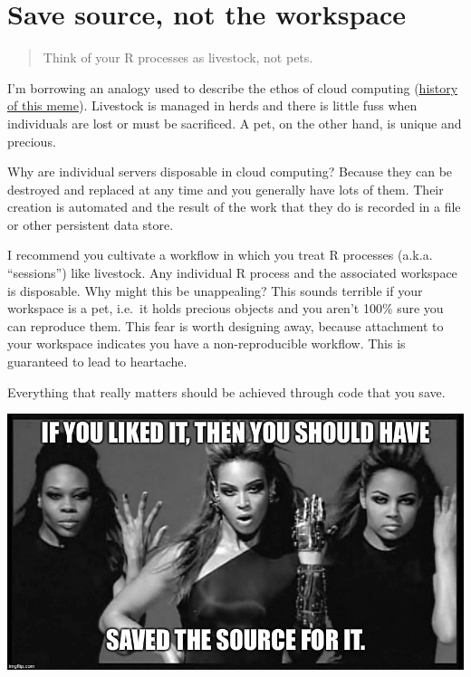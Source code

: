 \documentclass[
  letterpaper,
]{book}
\begin{document}
\hypertarget{save-source-not-the-workspace}{%
\section*{Save source, not the
workspace}\label{save-source-not-the-workspace}}

\begin{quote}
Think of your R processes as livestock, not pets.
\end{quote}

I'm borrowing an analogy used to describe the ethos of cloud computing
(\href{http://cloudscaling.com/blog/cloud-computing/the-history-of-pets-vs-cattle/}{history
of this meme}). Livestock is managed in herds and there is little fuss
when individuals are lost or must be sacrificed. A pet, on the other
hand, is unique and precious.

Why are individual servers disposable in cloud computing? Because they
can be destroyed and replaced at any time and you generally have lots of
them. Their creation is automated and the result of the work that they
do is recorded in a file or other persistent data store.

I recommend you cultivate a workflow in which you treat R processes
(a.k.a. ``sessions'') like livestock. Any individual R process and the
associated workspace is disposable. Why might this be unappealing? This
sounds terrible if your workspace is a pet, i.e.~it holds precious
objects and you aren't 100\% sure you can reproduce them. This fear is
worth designing away, because attachment to your workspace indicates you
have a non-reproducible workflow. This is guaranteed to lead to
heartache.

Everything that really matters should be achieved through code that you
save.

\includegraphics[width=1\textwidth,height=\textheight]{./img/if-you-liked-it-you-should-have-saved-the-source-for-it.jpg}
\end{document}
